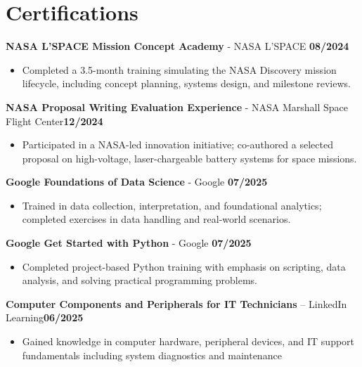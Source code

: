 \documentclass[letterpaper,11pt]{article}
\begin{document}
\section*{Certifications}
\textbf{NASA L'SPACE Mission Concept Academy} - NASA L'SPACE \hfill \textbf{08/2024}
\begin{itemize}
    \item Completed a 3.5-month training simulating the NASA Discovery mission lifecycle, including concept planning, systems
design, and milestone reviews.
\end{itemize}
\vspace{4mm}
\textbf{NASA Proposal Writing Evaluation Experience} - NASA Marshall Space Flight Center\hfill \textbf{12/2024}
\begin{itemize}
    \item Participated in a NASA-led innovation initiative; co-authored a selected proposal on high-voltage, laser-chargeable battery
systems for space missions.
\end{itemize}
\vspace{4mm}
\textbf{Google Foundations of Data Science} - Google \hfill \textbf{07/2025}
\begin{itemize}
    \item Trained in data collection, interpretation, and foundational analytics; completed exercises in data handling and real-world
scenarios.
\end{itemize}
\vspace{4mm}
\textbf{Google Get Started with Python} - Google \hfill \textbf{07/2025}
\begin{itemize}
    \item Completed project-based Python training with emphasis on scripting, data analysis, and solving practical programming
problems.
\end{itemize}
\vspace{4mm}
\textbf{Computer Components and Peripherals for IT Technicians} – LinkedIn Learning\hfill \textbf{06/2025}
\begin{itemize}
    \item Gained knowledge in computer hardware, peripheral devices, and IT support fundamentals including system diagnostics and
maintenance
\end{itemize}
\vspace{4mm}
\end{document}
